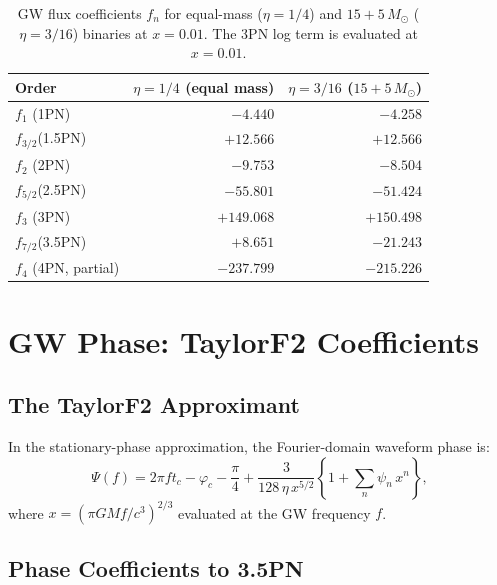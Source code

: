 \documentclass[11pt,a4paper]{article}
\newcommand{\Ms}{M_\odot}
\theoremstyle{definition}
\theoremstyle{remark}
\begin{document}
	\begin{table}[ht]
		\centering
		\caption{GW flux coefficients $f_n$ for equal-mass ($\eta=1/4$) and
			$15+5\,\Ms$ ($\eta=3/16$) binaries at $x=0.01$.
			The 3PN log term is evaluated at $x=0.01$.}
		\label{tab:flux_coefficients}
		\renewcommand{\arraystretch}{1.35}
		\begin{tabular}{lrr}
			\toprule
			Order & $\eta=1/4$ (equal mass) & $\eta=3/16$ ($15+5\,\Ms$) \\
			\midrule
			$f_1$    (1PN)   & $-4.440$ & $-4.258$ \\
			$f_{3/2}$(1.5PN) & $+12.566$  & $+12.566$ \\
			$f_2$    (2PN)   & $-9.753$ & $-8.504$ \\
			$f_{5/2}$(2.5PN) & $-55.801$ & $-51.424$ \\
			$f_3$    (3PN)   & $+149.068$ & $+150.498$ \\
			$f_{7/2}$(3.5PN) & $+8.651$ & $-21.243$ \\
			$f_4$    (4PN, partial) & $-237.799$ & $-215.226$ \\
			\bottomrule
		\end{tabular}
	\end{table}
	
	\section{GW Phase: TaylorF2 Coefficients}
	\label{sec:phase}
	
	\subsection{The TaylorF2 Approximant}
	
	In the stationary-phase approximation, the Fourier-domain waveform
	phase is:
	\begin{equation}
		\Psi(f) = 2\pi f t_c - \varphi_c - \frac{\pi}{4}
		+ \frac{3}{128\,\eta\,x^{5/2}}
		\left\{1 + \sum_{n}\psi_n\,x^n\right\},
		\label{eq:taylorf2}
	\end{equation}
	where $x=({\pi G M f}/{c^3})^{2/3}$ evaluated at the GW frequency $f$.
	
	\subsection{Phase Coefficients to 3.5PN}
	
\end{document}

